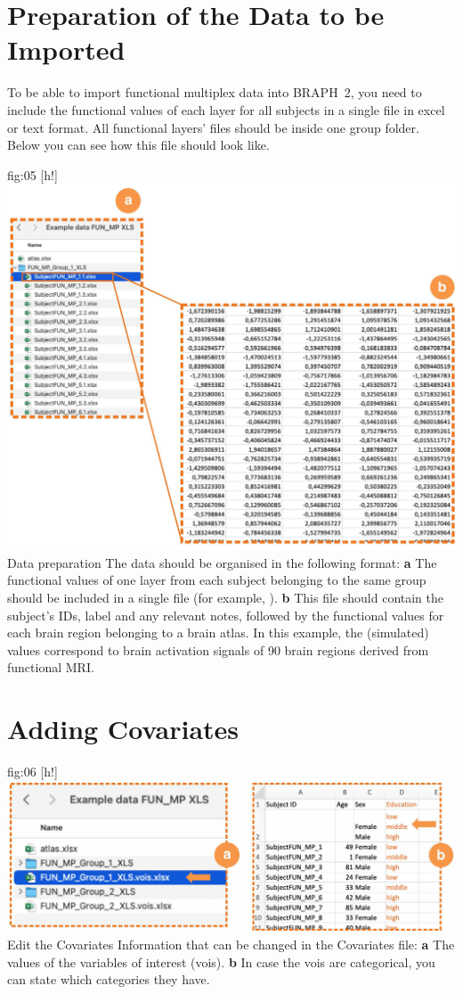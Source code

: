 \documentclass[justified]{tufte-handout}
\begin{document}

\clearpage
\section{Preparation of the Data to be Imported}

To be able to import functional multiplex data into BRAPH~2, you need to include the functional values of each layer for all subjects in a single file in excel or text format. All functional layers' files should be inside one group folder. Below you can see how this file should look like.

	{fig:05}
	{
	[h!]
	\includegraphics{fig05.jpg}
	}
	{Data preparation}
	{
	The data should be organised in the following format:
	{\bf a} The functional values of one layer from each subject belonging to the same group should be included in a single file (for example, ). 
	{\bf b} This file should contain the subject's IDs, label and any relevant notes, followed by the functional values for each brain region belonging to a brain atlas. In this example, the (simulated) values correspond to brain activation signals of 90 brain regions derived from functional MRI.
	}


\section{Adding Covariates}

	{fig:06}
	{
	[h!]
	\includegraphics{fig06.jpg}
	}
	{Edit the Covariates}
	{
	Information that can be changed in the Covariates file: 
	{\bf a} The values of the variables of interest (vois).
	{\bf b} In case the vois are categorical, you can state which categories they have.
	}
	
\end{document}
